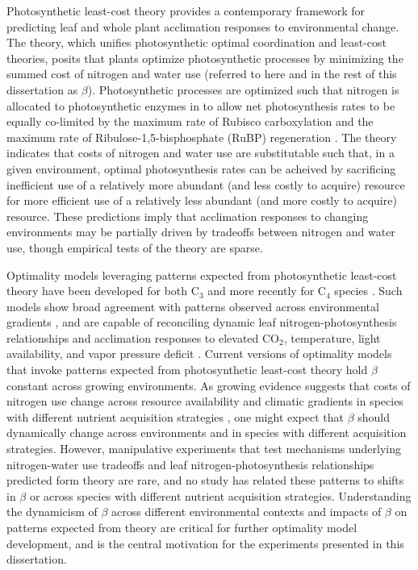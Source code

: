 Photosynthetic least-cost theory  provides a contemporary framework for predicting leaf and whole plant acclimation responses to environmental change. The theory, which unifies photosynthetic optimal coordination  and least-cost  theories, posits that plants optimize photosynthetic processes by minimizing the summed cost of nitrogen and water use (referred to here and in the rest of this dissertation as $\beta$). Photosynthetic processes are optimized such that nitrogen is allocated to photosynthetic enzymes in to allow net photosynthesis rates to be equally co-limited by the maximum rate of Rubisco carboxylation and the maximum rate of Ribulose-1,5-bisphosphate (RuBP) regeneration . The theory indicates that costs of nitrogen and water use are substitutable such that, in a given environment, optimal photosynthesis rates can be acheived by sacrificing inefficient use of a relatively more abundant (and less costly to acquire) resource for more efficient use of a relatively less abundant (and more costly to acquire) resource. These predictions imply that acclimation responses to changing environments may be partially driven by tradeoffs between nitrogen and water use, though empirical tests of the theory are sparse.

Optimality models leveraging patterns expected from photosynthetic least-cost theory have been developed for both C$_3$  and more recently for C$_4$ species . Such models show broad agreement with patterns observed across environmental gradients , and are capable of reconciling dynamic leaf nitrogen-photosynthesis relationships and acclimation responses to elevated CO$_2$, temperature, light availability, and vapor pressure deficit . Current versions of optimality models that invoke patterns expected from photosynthetic least-cost theory hold $\beta$ constant across growing environments. As growing evidence suggests that costs of nitrogen use change across resource availability and climatic gradients in species with different nutrient acquisition strategies , one might expect that $\beta$ should dynamically change across environments and in species with different acquisition strategies. However, manipulative experiments that test mechanisms underlying nitrogen-water use tradeoffs and leaf nitrogen-photosynthesis relationships predicted form theory are rare, and no study has related these patterns to shifts in $\beta$ or across species with different nutrient acquisition strategies. Understanding the dynamicism of $\beta$ across different environmental contexts and impacts of $\beta$ on patterns expected from theory are critical for further optimality model development, and is the central motivation for the experiments presented in this dissertation.

